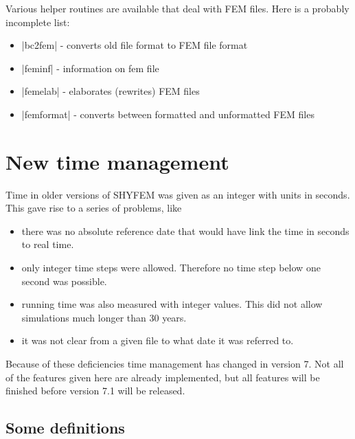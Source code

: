 \documentclass[12pt,draft]{article}
\newcommand{\shyfem}{SHYFEM}
\begin{document}
Various helper routines are available that deal with FEM files. Here
is a probably incomplete list:
\begin{itemize}
\item |bc2fem| - converts old file format to FEM file format
\item |feminf| - information on fem file
\item |femelab| - elaborates (rewrites) FEM files
\item |femformat| - converts between formatted and unformatted FEM files
\end{itemize}



\section{New time management}

Time in older versions of \shyfem{} was given as an integer
with units in seconds. This gave rise to a series of problems,
like
\begin{itemize}
\item there was no absolute reference date 
that would have link the time in seconds to real time.
\item only integer time steps were allowed. Therefore no time step below one second was possible.
\item running time was also measured with integer values. This did not allow simulations much longer than 30 years.
\item it was not clear from a given file to what date 
it was referred to.
\end{itemize}

Because of these deficiencies time management has changed in version 7. Not all of the features given here are already 
implemented, but all features will be finished before version 7.1
will be released.


\subsection{Some definitions}
\end{document}
